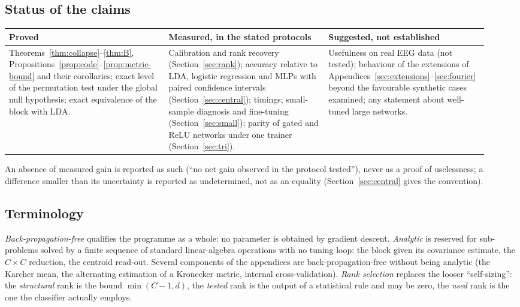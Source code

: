 \documentclass[11pt,a4paper]{article}
\theoremstyle{plain}
\theoremstyle{definition}
\theoremstyle{remark}
\begin{document}
\subsection{Status of the claims}
\begin{center}\small\renewcommand{\arraystretch}{1.15}
\begin{tabular}{@{}p{0.31\linewidth}p{0.31\linewidth}p{0.31\linewidth}@{}}
\toprule
\textbf{Proved} & \textbf{Measured, in the stated protocols} & \textbf{Suggested, not established} \\
\midrule
Theorems~\ref{thm:collapse}--\ref{thm:B},
Propositions~\ref{prop:code}--\ref{prop:metric-bound} and their
corollaries; exact level of the permutation test under the global null
hypothesis; exact equivalence of the block with LDA. &
Calibration and rank recovery (Section~\ref{sec:rank}); accuracy relative
to LDA, logistic regression and MLPs with paired confidence intervals
(Section~\ref{sec:central}); timings; small-sample diagnosis and
fine-tuning (Section~\ref{sec:small}); parity of gated and ReLU networks
under one trainer (Section~\ref{sec:tri}). &
Usefulness on real EEG data (not tested); behaviour of the extensions of
Appendices~\ref{sec:extensions}--\ref{sec:fourier} beyond the favourable
synthetic cases examined; any statement about well-tuned large networks. \\
\bottomrule
\end{tabular}
\end{center}
An absence of measured gain is reported as such (``no net gain observed in
the protocol tested''), never as a proof of uselessness; a difference
smaller than its uncertainty is reported as undetermined, not as an
equality (Section~\ref{sec:central} gives the convention).

\subsection{Terminology}
\emph{Back-propagation-free} qualifies the programme as a whole: no
parameter is obtained by gradient descent. \emph{Analytic} is reserved for
sub-problems solved by a finite sequence of standard linear-algebra
operations with no tuning loop: the block given its covariance estimate,
the $C\times C$ reduction, the centroid read-out. Several components of the
appendices are back-propagation-free without being analytic (the Karcher
mean, the alternating estimation of a Kronecker metric, internal
cross-validation). \emph{Rank selection} replaces the looser
``self-sizing'': the \emph{structural} rank is the bound $\min(C-1,d)$, the
\emph{tested} rank is the output of a statistical rule and may be zero, the
\emph{used} rank is the one the classifier actually employs.
\end{document}
